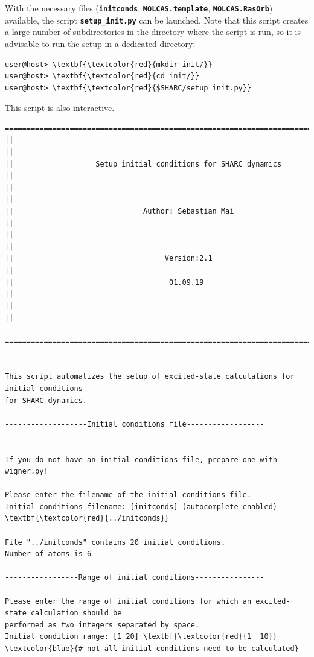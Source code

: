\documentclass[a4paper,11pt,DIV=15,openany]{scrbook}
\newcommand{\ttt}[1]{\textbf{\texttt{#1}}}
\begin{document}
With the necessary files (\ttt{initconds}, \ttt{MOLCAS.template}, \ttt{MOLCAS.RasOrb}) available, the script \ttt{setup\_init.py} can be launched.
Note that this script creates a large number of subdirectories in the directory where the script is run, so it is advisable to run the setup in a dedicated directory:
\begin{Verbatim}[commandchars=\\\{\}]
user@host> \textbf{\textcolor{red}{mkdir init/}}
user@host> \textbf{\textcolor{red}{cd init/}}
user@host> \textbf{\textcolor{red}{$SHARC/setup_init.py}}
\end{Verbatim}
This script is also interactive. 

\begin{oframed}
\footnotesize\begin{Verbatim}[commandchars=\\\{\}]
  ================================================================================
||                                                                                ||
||                   Setup initial conditions for SHARC dynamics                  ||
||                                                                                ||
||                              Author: Sebastian Mai                             ||
||                                                                                ||
||                                   Version:2.1                                  ||
||                                    01.09.19                                    ||
||                                                                                ||
  ================================================================================


This script automatizes the setup of excited-state calculations for initial conditions
for SHARC dynamics.

-------------------Initial conditions file------------------


If you do not have an initial conditions file, prepare one with wigner.py!

Please enter the filename of the initial conditions file.
Initial conditions filename: [initconds] (autocomplete enabled) \textbf{\textcolor{red}{../initconds}}

File "../initconds" contains 20 initial conditions.
Number of atoms is 6

-----------------Range of initial conditions----------------

Please enter the range of initial conditions for which an excited-state calculation should be 
performed as two integers separated by space.
Initial condition range: [1 20] \textbf{\textcolor{red}{1  10}}    \textcolor{blue}{# not all initial conditions need to be calculated}


\end{Verbatim}
\end{oframed}
\end{document}
